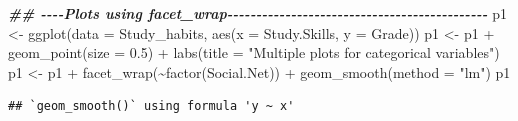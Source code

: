 \documentclass[
]{gitbook}
\newenvironment{Shaded}{\begin{snugshade}}{\end{snugshade}}
\newcommand{\AttributeTok}[1]{\textcolor[rgb]{0.77,0.63,0.00}{#1}}
\newcommand{\DocumentationTok}[1]{\textcolor[rgb]{0.56,0.35,0.01}{\textbf{\textit{#1}}}}
\newcommand{\FloatTok}[1]{\textcolor[rgb]{0.00,0.00,0.81}{#1}}
\newcommand{\FunctionTok}[1]{\textcolor[rgb]{0.00,0.00,0.00}{#1}}
\newcommand{\NormalTok}[1]{#1}
\newcommand{\OtherTok}[1]{\textcolor[rgb]{0.56,0.35,0.01}{#1}}
\newcommand{\SpecialCharTok}[1]{\textcolor[rgb]{0.00,0.00,0.00}{#1}}
\newcommand{\StringTok}[1]{\textcolor[rgb]{0.31,0.60,0.02}{#1}}
\begin{document}
\begin{Shaded}
\begin{Highlighting}[]
\DocumentationTok{\#\# {-}{-}{-}{-}Plots using facet\_wrap{-}{-}{-}{-}{-}{-}{-}{-}{-}{-}{-}{-}{-}{-}{-}{-}{-}{-}{-}{-}{-}{-}{-}{-}{-}{-}{-}{-}{-}{-}{-}{-}{-}{-}{-}{-}{-}{-}{-}{-}{-}{-}{-}{-}{-}}
\NormalTok{p1 }\OtherTok{\textless{}{-}} \FunctionTok{ggplot}\NormalTok{(}\AttributeTok{data =}\NormalTok{ Study\_habits, }\FunctionTok{aes}\NormalTok{(}\AttributeTok{x =}\NormalTok{ Study.Skills, }\AttributeTok{y =}\NormalTok{ Grade))}
\NormalTok{p1 }\OtherTok{\textless{}{-}}\NormalTok{ p1 }\SpecialCharTok{+} \FunctionTok{geom\_point}\NormalTok{(}\AttributeTok{size =} \FloatTok{0.5}\NormalTok{) }\SpecialCharTok{+} \FunctionTok{labs}\NormalTok{(}\AttributeTok{title =} \StringTok{"Multiple plots for categorical variables"}\NormalTok{)}
\NormalTok{p1 }\OtherTok{\textless{}{-}}\NormalTok{ p1 }\SpecialCharTok{+} \FunctionTok{facet\_wrap}\NormalTok{(}\SpecialCharTok{\textasciitilde{}}\FunctionTok{factor}\NormalTok{(Social.Net)) }\SpecialCharTok{+} \FunctionTok{geom\_smooth}\NormalTok{(}\AttributeTok{method =} \StringTok{"lm"}\NormalTok{)}
\NormalTok{p1}
\end{Highlighting}
\end{Shaded}

\begin{verbatim}
## `geom_smooth()` using formula 'y ~ x'
\end{verbatim}
\end{document}
